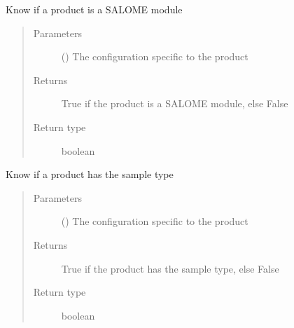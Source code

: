 \documentclass[a4paper,10pt,english]{sphinxmanual}
\begin{document}

\begin{fulllineitems}
\label{\detokenize{commands/apidoc/src:src.product.product_is_salome}}
Know if a product is a SALOME module
\begin{quote}\begin{description}
\item[{Parameters}] \leavevmode
{} () \textendash{} The configuration specific to 
the product

\item[{Returns}] \leavevmode
True if the product is a SALOME module, else False

\item[{Return type}] \leavevmode
boolean

\end{description}\end{quote}

\end{fulllineitems}


\begin{fulllineitems}
\label{\detokenize{commands/apidoc/src:src.product.product_is_sample}}
Know if a product has the sample type
\begin{quote}\begin{description}
\item[{Parameters}] \leavevmode
{} () \textendash{} The configuration specific to 
the product

\item[{Returns}] \leavevmode
True if the product has the sample type, else False

\item[{Return type}] \leavevmode
boolean

\end{description}\end{quote}

\end{fulllineitems}
\end{document}
